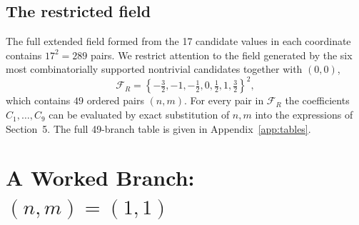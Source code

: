 \documentclass[11pt]{article}
\begin{document}
\subsection{The restricted field}

The full extended field formed from the 17 candidate values in each coordinate contains
$17^2=289$ pairs. We restrict attention to the field generated by the six most
combinatorially supported nontrivial candidates together with $(0,0)$,
\begin{equation}
\mathcal{F}_R=\left\{-\tfrac32,-1,-\tfrac12,0,\tfrac12,1,\tfrac32\right\}^2,
\end{equation}
which contains $49$ ordered pairs $(n,m)$. For every pair in $\mathcal{F}_R$ the coefficients
$C_1,\dots,C_9$ can be evaluated by exact substitution of $n,m$ into the expressions of
Section~5. The full 49-branch table is given in Appendix~\ref{app:tables}.

\section{A Worked Branch: $(n,m)=(1,1)$}
\label{sec:worked}
\end{document}
